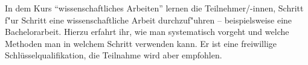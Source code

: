 In dem Kurs "`wissenschaftliches Arbeiten"' lernen die Teilnehmer/-innen, Schritt f"ur Schritt eine wissenschaftliche Arbeit durchzuf"uhren -- beispielsweise eine Bachelorarbeit.
Hierzu erfahrt ihr, wie man systematisch vorgeht und welche Methoden
man in welchem Schritt verwenden kann. Er ist eine freiwillige
Schlüsselqualifikation, die Teilnahme wird aber empfohlen.



